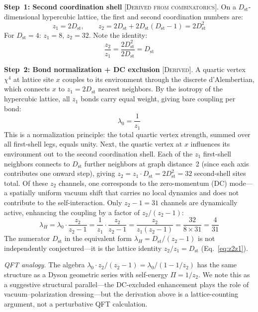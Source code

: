 \documentclass[12pt,a4paper]{article}
\newcommand{\Dst}{D_{\mathrm{st}}}
\begin{document}
\textbf{Step~1: Second coordination shell} [\textsc{Derived from combinatorics}]. On a $\Dst$-dimensional hypercubic lattice, the first and second coordination numbers are:
\begin{equation}
z_1 = 2\Dst, \qquad z_2 = 2\Dst + 2\Dst(\Dst - 1) = 2\Dst^2
\end{equation}
For $\Dst = 4$: $z_1 = 8$, $z_2 = 32$. Note the identity:
\begin{equation}\label{eq:z2z1}
\frac{z_2}{z_1} = \frac{2\Dst^2}{2\Dst} = \Dst
\end{equation}

\textbf{Step~2: Bond normalization + DC exclusion} [\textsc{Derived}]. A quartic vertex $\chi^4$ at lattice site $x$ couples to its environment through the discrete d'Alembertian, which connects $x$ to $z_1 = 2\Dst$ nearest neighbors. By the isotropy of the hypercubic lattice, all $z_1$ bonds carry equal weight, giving bare coupling per bond:
\begin{equation}
\lambda_0 = \frac{1}{z_1}
\end{equation}
This is a normalization principle: the total quartic vertex strength, summed over all first-shell legs, equals unity. Next, the quartic vertex at $x$ influences its environment out to the second coordination shell. Each of the $z_1$ first-shell neighbors connects to $\Dst$ further neighbors at graph distance~2 (since each axis contributes one onward step), giving $z_2 = z_1 \cdot \Dst = 2\Dst^2 = 32$ second-shell sites total. Of these $z_2$ channels, one corresponds to the zero-momentum (DC) mode---a spatially uniform vacuum shift that carries no local dynamics and does not contribute to the self-interaction. Only $z_2 - 1 = 31$ channels are dynamically active, enhancing the coupling by a factor of $z_2/(z_2 - 1)$:
\begin{equation}\label{eq:z2}
\boxed{\lambda_H = \lambda_0 \cdot \frac{z_2}{z_2 - 1} = \frac{1}{z_1} \cdot \frac{z_2}{z_2 - 1} = \frac{z_2}{z_1(z_2 - 1)} = \frac{32}{8 \times 31} = \frac{4}{31}}
\end{equation}
The numerator $\Dst$ in the equivalent form $\lambda_H = \Dst/(z_2 - 1)$ is not independently conjectured---it is the lattice identity $z_2/z_1 = \Dst$ (Eq.~\ref{eq:z2z1}).

\textit{QFT analogy.} The algebra $\lambda_0 \cdot z_2/(z_2-1) = \lambda_0/(1-1/z_2)$ has the same structure as a Dyson geometric series \citep{Dyson1949} with self-energy $\Pi = 1/z_2$. We note this as a suggestive structural parallel---the DC-excluded enhancement plays the role of vacuum--polarization dressing---but the derivation above is a lattice-counting argument, not a perturbative QFT calculation.
\end{document}
